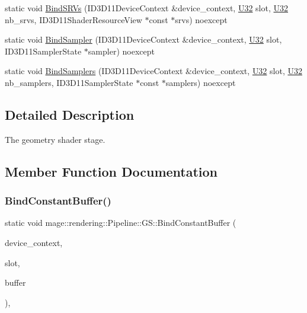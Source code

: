 \begin{DoxyCompactItemize}
\item 
static void \mbox{\hyperlink{structmage_1_1rendering_1_1_pipeline_1_1_g_s_a17af990401a5cfddc34a9d7dc51b8221}{Bind\+S\+R\+Vs}} (I\+D3\+D11\+Device\+Context \&device\+\_\+context, \mbox{\hyperlink{namespacemage_aa5d6eaabaac3cdd01873d6a3d27e90f3}{U32}} slot, \mbox{\hyperlink{namespacemage_aa5d6eaabaac3cdd01873d6a3d27e90f3}{U32}} nb\+\_\+srvs, I\+D3\+D11\+Shader\+Resource\+View $\ast$const $\ast$srvs) noexcept
\item 
static void \mbox{\hyperlink{structmage_1_1rendering_1_1_pipeline_1_1_g_s_af846ee676c31f5b7bebb0578600e2208}{Bind\+Sampler}} (I\+D3\+D11\+Device\+Context \&device\+\_\+context, \mbox{\hyperlink{namespacemage_aa5d6eaabaac3cdd01873d6a3d27e90f3}{U32}} slot, I\+D3\+D11\+Sampler\+State $\ast$sampler) noexcept
\item 
static void \mbox{\hyperlink{structmage_1_1rendering_1_1_pipeline_1_1_g_s_af758f82f4475d948564be7ef0214d315}{Bind\+Samplers}} (I\+D3\+D11\+Device\+Context \&device\+\_\+context, \mbox{\hyperlink{namespacemage_aa5d6eaabaac3cdd01873d6a3d27e90f3}{U32}} slot, \mbox{\hyperlink{namespacemage_aa5d6eaabaac3cdd01873d6a3d27e90f3}{U32}} nb\+\_\+samplers, I\+D3\+D11\+Sampler\+State $\ast$const $\ast$samplers) noexcept
\end{DoxyCompactItemize}


\subsection{Detailed Description}
The geometry shader stage. 

\subsection{Member Function Documentation}
\mbox{\label{structmage_1_1rendering_1_1_pipeline_1_1_g_s_a3819a60a62e21bd9de227dd05ae77718}} 
\subsubsection{\texorpdfstring{Bind\+Constant\+Buffer()}{BindConstantBuffer()}}
{\footnotesize\ttfamily static void mage\+::rendering\+::\+Pipeline\+::\+G\+S\+::\+Bind\+Constant\+Buffer (\begin{DoxyParamCaption}\item[{I\+D3\+D11\+Device\+Context \&}]{device\+\_\+context,  }\item[{\mbox{\hyperlink{namespacemage_aa5d6eaabaac3cdd01873d6a3d27e90f3}{U32}}}]{slot,  }\item[{I\+D3\+D11\+Buffer $\ast$}]{buffer }\end{DoxyParamCaption})\hspace{0.3cm}{\ttfamily [static]}, {\ttfamily [noexcept]}}


